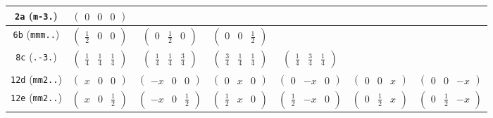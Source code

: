 \documentclass[fleqn,9pt,landscape]{jsarticle}
\begin{document}
\begin{center}
\begin{longtable}{ccccccc}
{\tt 2a} ({\tt m-3.}) & $ \begin{pmatrix} 0 & 0 & 0 \end{pmatrix} $ & $  $ & $  $ & $  $ & $  $ & $  $ \\ \hline
{\tt 6b} ({\tt mmm..}) & $ \begin{pmatrix} \frac{1}{2} & 0 & 0 \end{pmatrix} $ & $ \begin{pmatrix} 0 & \frac{1}{2} & 0 \end{pmatrix} $ & $ \begin{pmatrix} 0 & 0 & \frac{1}{2} \end{pmatrix} $ & $  $ & $  $ & $  $ \\ \hline
{\tt 8c} ({\tt .-3.}) & $ \begin{pmatrix} \frac{1}{4} & \frac{1}{4} & \frac{1}{4} \end{pmatrix} $ & $ \begin{pmatrix} \frac{1}{4} & \frac{1}{4} & \frac{3}{4} \end{pmatrix} $ & $ \begin{pmatrix} \frac{3}{4} & \frac{1}{4} & \frac{1}{4} \end{pmatrix} $ & $ \begin{pmatrix} \frac{1}{4} & \frac{3}{4} & \frac{1}{4} \end{pmatrix} $ & $  $ & $  $ \\ \hline
{\tt 12d} ({\tt mm2..}) & $ \begin{pmatrix} x & 0 & 0 \end{pmatrix} $ & $ \begin{pmatrix} - x & 0 & 0 \end{pmatrix} $ & $ \begin{pmatrix} 0 & x & 0 \end{pmatrix} $ & $ \begin{pmatrix} 0 & - x & 0 \end{pmatrix} $ & $ \begin{pmatrix} 0 & 0 & x \end{pmatrix} $ & $ \begin{pmatrix} 0 & 0 & - x \end{pmatrix} $ \\ \hline
{\tt 12e} ({\tt mm2..}) & $ \begin{pmatrix} x & 0 & \frac{1}{2} \end{pmatrix} $ & $ \begin{pmatrix} - x & 0 & \frac{1}{2} \end{pmatrix} $ & $ \begin{pmatrix} \frac{1}{2} & x & 0 \end{pmatrix} $ & $ \begin{pmatrix} \frac{1}{2} & - x & 0 \end{pmatrix} $ & $ \begin{pmatrix} 0 & \frac{1}{2} & x \end{pmatrix} $ & $ \begin{pmatrix} 0 & \frac{1}{2} & - x \end{pmatrix} $ \\ \hline

\end{longtable}
\end{center}
\end{document}
